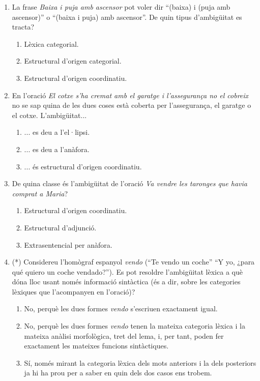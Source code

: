 \begin{enumerate}
\item La frase \emph{Baixa i puja amb ascensor} pot voler dir ``(baixa) i
  (puja amb ascensor)'' o ``(baixa i puja) amb ascensor''.  De quin
  tipus d'ambigüitat es tracta?
  \begin{enumerate}
  \item Lèxica categorial.
  \item Estructural d'origen categorial.
  \item Estructural d'origen coordinatiu.
  \end{enumerate}

\item En l'oració \emph{El cotxe s'ha cremat amb el garatge i
    l'assegurança no el cobreix} no se sap quina de les dues coses
  està coberta per l'assegurança, el garatge o el
  cotxe. L'ambigüitat...
  \begin{enumerate}
  \item ... es deu a l'el·lipsi.
  \item ... es deu a l'anàfora.
  \item ... és estructural d'origen coordinatiu.
  \end{enumerate}

\item De quina classe és l'ambigüitat de l'oració \emph{Va vendre les
  taronges que havia comprat a Maria}?
  \begin{enumerate}
  \item Estructural d'origen coordinatiu.
  \item Estructural d'adjunció.
  \item Extrasentencial per anàfora.
\end{enumerate}

\item (*) Considereu l'homògraf espanyol \emph{vendo} (``Te vendo un
  coche'' ``Y yo, ¿para qué quiero un coche vendado?''). Es pot
  resoldre l'ambigüitat lèxica a què dóna lloc usant només informació
  sintàctica (és a dir, sobre les categories lèxiques que l'acompanyen
  en l'oració)?
  \begin{enumerate}
  \item No, perquè les dues formes \emph{vendo} s'escriuen exactament
    igual.
  \item No, perquè les dues formes \emph{vendo} tenen la mateixa
    categoria lèxica i la mateixa anàlisi morfològica, tret del lema,
    i, per tant, poden fer exactament les mateixes funcions
    sintàctiques.
  \item Sí, només mirant la categoria lèxica dels mots anteriors i la
    dels posteriors ja hi ha prou per a saber en quin dels dos casos
    ens trobem.
  \end{enumerate}


\end{enumerate}
